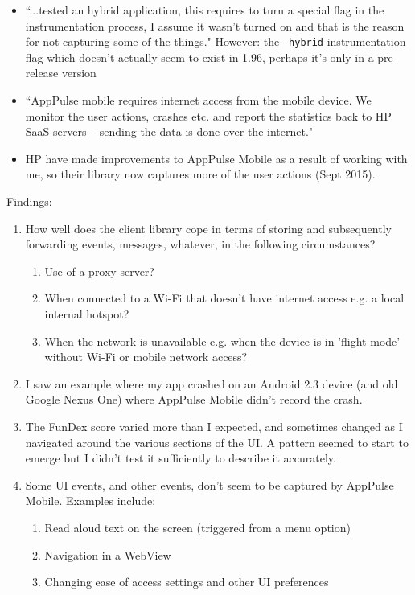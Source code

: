 \begin{itemize}
    \item ``...tested an hybrid application, this requires to turn a special flag in the instrumentation process, I assume it wasn’t turned on and that is the reason for not capturing some of the things." However: the \texttt{-hybrid} instrumentation flag which doesn't actually seem to exist in 1.96, perhaps it's only in a pre-release version
    \item ``AppPulse mobile requires internet access from the mobile device. We monitor the user actions, crashes etc. and report the statistics back to HP SaaS servers – sending the data is done over the internet."
    \item HP have made improvements to AppPulse Mobile as a result of working with me, so their library now captures more of the user actions (Sept 2015).
\end{itemize}

Findings: 
\begin{enumerate}
    \item How well does the client library cope in terms of storing and subsequently forwarding events, messages, whatever, in the following circumstances?
    \begin{enumerate}
        \item Use of a proxy server?
        \item When connected to a Wi-Fi that doesn't have internet access e.g. a local internal hotspot?
        \item When the network is unavailable e.g. when the device is in 'flight mode' without Wi-Fi or mobile network access?
    \end{enumerate}
    \item I saw an example where my app crashed on an Android 2.3 device (and old Google Nexus One) where AppPulse Mobile didn't record the crash.
    \item The FunDex score varied more than I expected, and sometimes changed as I navigated around the various sections of the UI. A pattern seemed to start to emerge but I didn't test it sufficiently to describe it accurately.
    \item Some UI events, and other events, don't seem to be captured by AppPulse Mobile. Examples include:
    \begin{enumerate}
        \item Read aloud text on the screen (triggered from a menu option)
        \item Navigation in a WebView
        \item Changing ease of access settings and other UI preferences
    \end{enumerate}
\end{enumerate}

